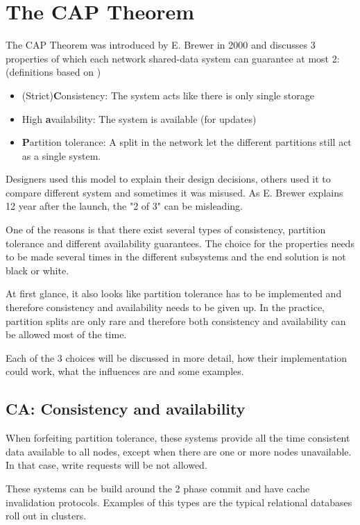\documentclass[10pt,conference,letterpaper]{IEEEtran}
\begin{document}
\section{The CAP Theorem\cite{brewer2000towards}\cite{brewer2012cap}}\label{sec:CAPTheorem}
The CAP Theorem was introduced by E. Brewer \cite{brewer2000towards}  in 2000 and discusses 3 properties of which each network shared-data system can guarantee at most 2: (definitions based on \cite{brewer2012cap})
\begin{itemize}
\item (Strict)\textbf{C}onsistency: The system acts like there is only single storage 
\item High \textbf{a}vailability: The system is available (for updates)
\item \textbf{P}artition tolerance: A split in the network let the different partitions still act as a single system. 
\end{itemize}
Designers used this model to explain their design decisions, others used it to compare different system and sometimes it was misused. As E. Brewer explains 12 year after the launch, the "2 of 3" can be misleading.

One of the reasons is that there exist several types of consistency, partition tolerance and different availability guarantees. The choice for the properties needs to be made several times in the different subsystems and the end solution is not black or white. 

At first glance, it also looks like partition tolerance has to be implemented and therefore consistency and availability needs to be given up. In the practice, partition splits are only rare and therefore both consistency and availability can be allowed most of the time. 

Each of the 3 choices will be discussed in more detail, how their implementation could work, what the influences are and some examples. 

\subsection{CA: Consistency and availability}
When forfeiting partition tolerance, these systems provide all the time consistent data available to all nodes, except when there are one or more nodes unavailable. In that case, write requests will be not allowed. 

These systems can be build around the 2 phase commit and have cache invalidation protocols. Examples of this types are the typical relational databases roll out in clusters. 
\end{document}

